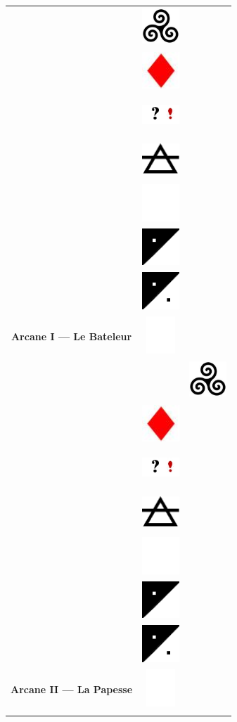 \documentclass[11pt,oneside,a4paper]{article} %
\newcommand{\colornone}{ \includegraphics[width=1.40cm, height=1.40cm]{../../tarotData/img/color_none.jpg} }
\newcommand{\colorcarr}{ \includegraphics[width=1.40cm, height=1.40cm]{../../tarotData/img/color_carreau.jpg} }
\newcommand{\colorinte}{ \includegraphics[width=1.40cm, height=1.40cm]{../../tarotData/img/color_interrexclam.jpg} }
\newcommand{\elementair}{ \includegraphics[width=1.40cm, height=1.40cm]{../../tarotData/img/element_air.jpg} }
\newcommand{\tricurve}{ \includegraphics[width=1.40cm, height=1.40cm]{../img/tricurve.jpg} }
\newcommand{\partEmpt}{ \includegraphics[width=1.40cm, height=1.40cm]{../img/CountEmptyPart.png} }
\newcommand{\partHalf}{ \includegraphics[width=1.40cm, height=1.40cm]{../img/CountHalfPart.png} }
\newcommand{\partPlai}{ \includegraphics[width=1.40cm, height=1.40cm]{../img/CountPlainPart.png} }
\begin{document}
\begin{longtable}[ht]{ c c c }
{\begin{tabular}[ht]{ @{}m{4.50cm}@{} @{}p{1.50cm}@{} }
											&	\tricurve		\\
											&	\colorcarr		\\
											&	\colorinte		\\
											&	\elementair		\\
											&	\partEmpt		\\
											&	\partHalf		\\
											&	\partPlai		\\
			\hline
			\textbf{\footnotesize Arcane I --- Le Bateleur}		&	\colornone		\\
		\end{tabular}
	}	&
	\Ovalbox{%
		\begin{tabular}[ht]{ @{}m{4.50cm}@{} @{}p{1.50cm}@{} }
			\multirow{ 7 }{4.45cm}{ \includegraphics[width=4.45cm, height=9.00cm]{../../tarotData/img/2_LaPapesse.jpg} \vfill } 
											&	\tricurve		\\
											&	\colorcarr		\\
											&	\colorinte		\\
											&	\elementair		\\
											&	\partEmpt		\\
											&	\partHalf		\\
											&	\partPlai		\\
			\hline
			\textbf{\footnotesize Arcane II --- La Papesse}		&	\colornone		\\
		\end{tabular}
	}	\\
	
	

\end{longtable}
\end{document}
